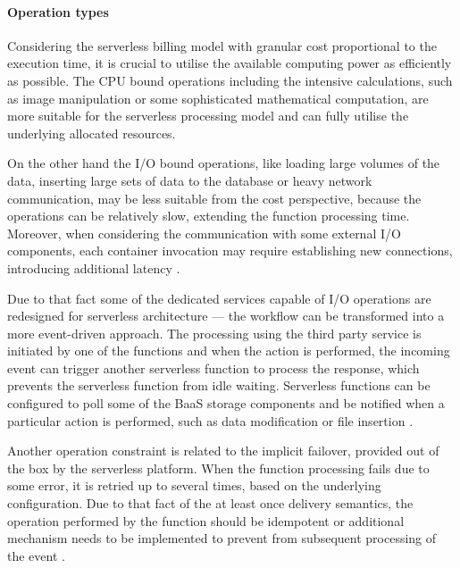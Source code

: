 \paragraph{Operation types} \label{chapter:serverless-suitability-operation-types}

Considering the serverless billing model with granular cost proportional to the execution time, it is crucial to utilise the available computing power as efficiently as possible. The CPU bound operations including the intensive calculations, such as image manipulation or some sophisticated mathematical computation, are more suitable for the serverless processing model and can fully utilise the underlying allocated resources.

On the other hand the I/O bound operations, like loading large volumes of the data, inserting large sets of data to the database or heavy network communication, may be less suitable from the cost perspective, because the operations can be relatively slow, extending the function processing time. Moreover, when considering the communication with some external I/O components, each container invocation may require establishing new connections, introducing additional latency \cite{LeveragingServerlessCloudComputingArchitectures}.

Due to that fact some of the dedicated services capable of I/O operations are redesigned for serverless architecture --- the workflow can be transformed into a more event-driven approach. The processing using the third party service is initiated by one of the functions and when the action is performed, the incoming event can trigger another serverless function to process the response, which prevents the serverless function from idle waiting. Serverless functions can be configured to poll some of the BaaS storage components and be notified when a particular action is performed, such as data modification or file insertion \cite{EvaluationOfServerlessApplicationProgrammingModel}.

Another operation constraint is related to the implicit failover, provided out of the box by the serverless platform. When the function processing fails due to some error, it is retried up to several times, based on the underlying configuration. Due to that fact of the at least once delivery semantics, the operation performed by the function should be idempotent or additional mechanism needs to be implemented to prevent from subsequent processing of the event \cite{EvaluationOfServerlessApplicationProgrammingModel}.

